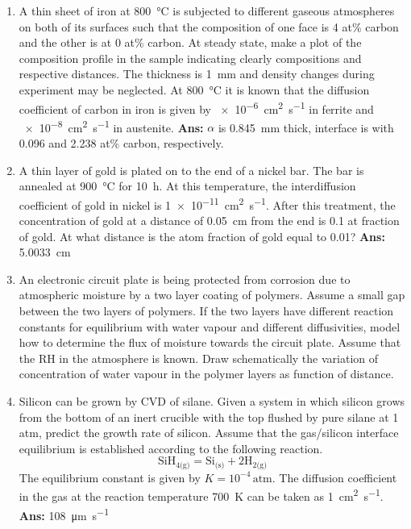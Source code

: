 \begin{enumerate}
\item A thin sheet of iron at \SI{800}{\celsius} is subjected to different gaseous atmospheres on both of its surfaces such that the composition of one face is 4 at\% carbon and the other is at 0 at\% carbon. At steady state, make a plot of the composition profile in the sample indicating clearly compositions and respective distances. The thickness is \SI{1}{\milli\meter} and density changes during experiment may be neglected. At \SI{800}{\celsius} it is known that the diffusion coefficient of carbon in iron is given by \SI{e-6}{\centi\meter\squared\per\second} in ferrite and \SI{e-8}{\centi\meter\squared\per\second} in austenite. {\bf Ans:} $\alpha$ is \SI{0.845}{\milli\meter} thick, interface is with 0.096 and 2.238 at\% carbon, respectively.

\item A thin layer of gold is plated on to the end of a nickel bar. The bar is annealed at \SI{900}{\celsius} for \SI{10}{\hour}. At this temperature, the interdiffusion coefficient of gold in nickel is \SI{1e-11}{\centi\meter\squared\per\second}. After this treatment, the concentration of gold at a distance of \SI{0.05}{\centi\meter} from the end is 0.1 at fraction of gold. At what distance is the atom fraction of gold equal to 0.01? {\bf Ans:} \SI{5.0033}{\centi\meter}

\item An electronic circuit plate is being protected from corrosion due to atmospheric moisture by a two layer coating of polymers. Assume a small gap between the two layers of polymers. If the two layers have different reaction constants for equilibrium with water vapour and different diffusivities, model how to determine the flux of moisture towards the circuit plate. Assume that the RH in the atmosphere is known. Draw schematically the variation of concentration of water vapour in the polymer layers as function of distance.

\item Silicon can be grown by CVD of silane. Given a system in which silicon grows from the bottom of an inert crucible with the top flushed by pure silane at 1 atm, predict the growth rate of silicon. Assume that the gas/silicon interface equilibrium is established according to the following reaction. 
$$ \text{SiH}_{4\text{(g)}} = \text{Si}_{\text{(s)}} + 2\text{H}_{2\text{(g)}} $$ 
The equilibrium constant is given by $K = 10^{-4} \, \text{atm}$. The diffusion coefficient in the gas at the reaction temperature \SI{700}{\kelvin} can be taken as \SI{1}{\centi\meter\squared\per\second}. {\bf Ans:} \SI{108}{\micro\meter\per\second}


\end{enumerate}
